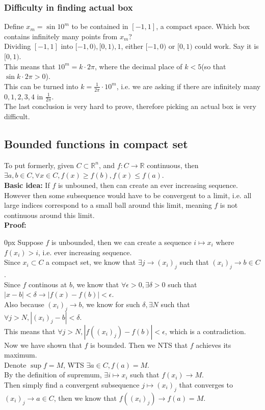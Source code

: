 \documentclass{article}
\begin{document}
\subsubsection{Difficulty in finding actual box}
Define $x_m = \sin 10^m$ to be contained in $[-1, 1]$, a compact space. Which box contains infinitely many points from $x_m$?\\
Dividing $[-1, 1]$ into $[-1,0), [0,1), {1}$, either $[-1, 0)$ or $[0,1)$ could work. Say it is $[0,1)$.\\
This means that $10^m = k\cdot 2\pi$, where the decimal place of $k < 5$(so that $\sin k\cdot 2\pi > 0$).\\
This can be turned into $k = \frac{1}{2\pi}\cdot 10^m$, i.e. we are asking if there are infinitely many $0,1,2,3,4$ in $\frac{1}{2\pi}$.\\
The last conclusion is very hard to prove, therefore picking an actual box is very difficult.
\subsection{Bounded functions in compact set}
To put formerly, given $C \subset \mathbb{R}^n$, and $f: C \rightarrow \mathbb{R}$ continuous, then $\exists a, b \in C, \forall x \in C, f(x) \geq f(b), f(x) \leq f(a)$.\\
\textbf{Basic idea:} If $f$ is unbouned, then can create an ever increasing sequence. However then some subsequence would have to be convergent to a limit, i.e. all large indices correspond to a small ball around this limit, meaning $f$ is not continuous around this limit.\\
\textbf{Proof:}
\begin{addmargin}[10px]{0px}
    Suppose $f$ is unbounded, then we can create a sequence $i \mapsto x_i$ where $f(x_i) > i$, i.e. ever increasing sequence.\\
    Since $x_i \subset C$ a compact set, we know that $\exists j \rightarrow (x_i)_j$ such that $(x_i)_j \rightarrow b \in C$.\\
    Since $f$ continous at $b$, we know that $\forall \epsilon > 0, \exists \delta > 0$ such that $|x-b| < \delta \rightarrow |f(x) - f(b)| < \epsilon$.\\
    Also because $(x_i)_j \rightarrow b$, we know for such $\delta, \exists N$ such that $\forall j > N, |(x_i)_j - b| < \delta$.\\
    This means that $\forall j > N, |f((x_i)_j) - f(b)| < \epsilon$, which is a contradiction.\\
    Now we have shown that $f$ is bounded. Then we NTS that $f$ achieves its maximum.\\
    Denote $\sup f = M$, WTS $\exists a \in C, f(a) = M$.\\
    By the definition of supremum, $\exists i \mapsto x_i$  such that $f(x_i) \rightarrow M$.\\
    Then simply find a convergent subsequence $j \mapsto (x_i)_j$ that converges to $(x_i)_j \rightarrow a \in C$, then we know that $f((x_i)_j) \rightarrow f(a) = M$.
\end{addmargin}
\end{document}

